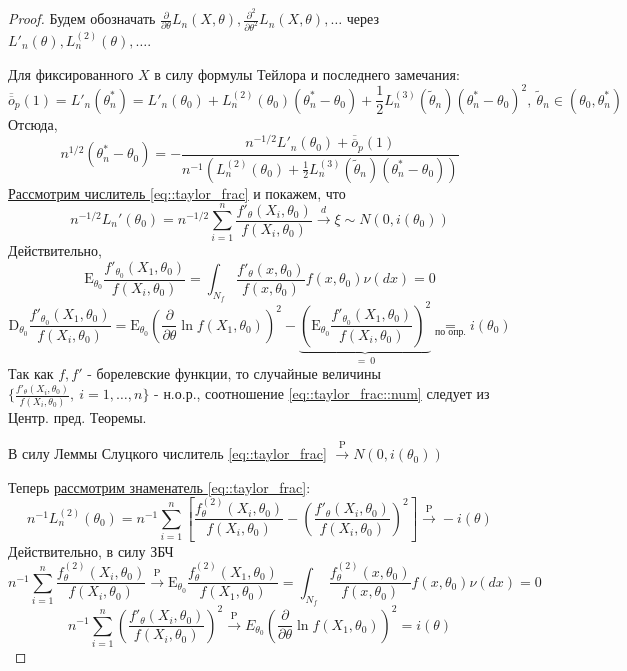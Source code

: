 \documentclass[12pt]{article}
\theoremstyle{basic_theorem}
\theoremstyle{name_theorem}
\def\E{
    \mathrm{E}
}
\def\D{
    \mathrm{D}
}
\def\P{
    \mathrm{P}
}
\def\littleO{
    \overline{\overline{o}}
}
\begin{document}
    \begin{proof}
        Будем обозначать $\frac{\partial}{\partial\theta}L_n(X, \theta), \frac{\partial^2}{\partial\theta^2}L_n(X, \theta), \ldots$
        через $L'_n(\theta), L^{(2)}_n(\theta), \ldots$.

        Для фиксированного $X$ в силу формулы Тейлора и последнего замечания:
        $$\littleO_p(1) = L'_n(\theta^*_n) = L'_n(\theta_0) + L^{(2)}_n(\theta_0)(\theta^*_n - \theta_0) + 
        \frac{1}{2}L_n^{(3)}(\widetilde{\theta}_n)(\theta^*_n - \theta_0)^2,\ \widetilde{\theta}_n \in(\theta_0, \theta_n^*)$$
        Отсюда,
        \begin{equation}
            \label{eq::taylor_frac}
            n^{1/2}(\theta^*_n - \theta_0) = -\frac{n^{-1/2} L'_n(\theta_0) + \littleO_p(1)}{n^{-1}(L^{(2)}_n(\theta_0) + \frac{1}{2}L^{(3)}_n(\widetilde{\theta}_n)(\theta^*_n - \theta_0))}
        \end{equation}
        \underline{Рассмотрим числитель \ref{eq::taylor_frac}} и покажем, что
        \begin{equation}
            \label{eq::taylor_frac::num}
            n^{-1/2}L_n'(\theta_0) = n^{-1/2}\sum_{i=1}^n \frac{f'_\theta(X_i, \theta_0)}{f(X_i, \theta_0)} \xrightarrow{d} \xi\sim N(0, i(\theta_0))
        \end{equation}
        Действительно, 
        $$\E_{\theta_0}\frac{f'_{\theta_0}(X_1, \theta_0)}{f(X_i, \theta_0)} = \int_{N_f}\frac{f'_\theta(x, \theta_0)}{f(x,\theta_0)} f(x,\theta_0) \nu(dx) = 0$$
        $$\D_{\theta_0}\frac{f'_{\theta_0}(X_1, \theta_0)}{f(X_i, \theta_0)} = \E_{\theta_0}\left(\frac{\partial}{\partial\theta}\ln f(X_1, \theta_0)\right)^2 - \underbrace{\left(\E_{\theta_0}\frac{f'_{\theta_0}(X_1, \theta_0)}{f(X_i, \theta_0)}\right)^2 }_{ =\ 0} \underset{\text{по опр.}}{=} i(\theta_0)$$
        Так как $f, f'$ - борелевские функции, то случайные величины $\{\frac{f'_\theta(X_i, \theta_0)}{f(X_i, \theta_0)},\ i=1,\ldots,n\}$ - н.о.р.,
        соотношение \ref{eq::taylor_frac::num} следует из Центр. пред. Теоремы.
        
        В силу Леммы Слуцкого числитель \ref{eq::taylor_frac} $\xrightarrow{\P} N(0, i(\theta_0))$

        Теперь \underline{рассмотрим знаменатель \ref{eq::taylor_frac}}:
        \begin{equation}
            \label{eq::taylor_frac::den}
            n^{-1}L_n^{(2)}(\theta_0) = n^{-1}\sum^n_{i=1}\left[ \frac{f^{(2)}_\theta(X_i, \theta_0)}{f(X_i, \theta_0)} - \left(\frac{f'_\theta(X_i, \theta_0)}{f(X_i, \theta_0)}\right)^2\right] \xrightarrow{\P} -i(\theta)
        \end{equation}
        Действительно, в силу ЗБЧ
        $$n^{-1}\sum^n_{i=1} \frac{f^{(2)}_\theta(X_i, \theta_0)}{f(X_i, \theta_0)} \xrightarrow{\P} \E_{\theta_0}\frac{f^{(2)}_\theta(X_1, \theta_0)}{f(X_1, \theta_0)} = \int_{N_f} \frac{f^{(2)}_\theta(x, \theta_0)}{f(x, \theta_0)} f(x, \theta_0) \nu(dx) = 0$$
        $$n^{-1}\sum^n_{i=1} \left(\frac{f'_\theta(X_i, \theta_0)}{f(X_i, \theta_0)}\right)^2 \xrightarrow{\P} E_{\theta_0} \left(\frac{\partial}{\partial\theta} \ln f(X_1, \theta_0)\right)^2 = i(\theta)$$
    

\end{proof}
\end{document}
